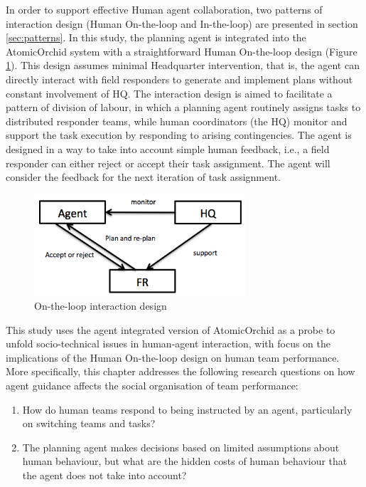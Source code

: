In order to support effective Human agent collaboration, two patterns of interaction design (Human On-the-loop and In-the-loop) are presented in section \ref{sec:patterns}. In this study, the planning agent is integrated into the AtomicOrchid system with a straightforward Human On-the-loop design (Figure \ref{fig:study2OnTheLoop}). This design assumes minimal Headquarter intervention, that is, the agent can directly interact with field responders to generate and implement plans without constant involvement of HQ. The interaction design is aimed to facilitate a pattern of division of labour, in which a planning agent routinely assigns tasks to distributed responder teams, while human coordinators (the HQ) monitor and support the task execution by responding to arising contingencies. The agent is designed in a way to take into account simple human feedback, i.e., a field responder can either reject or accept their task assignment. The agent will consider the feedback for the next iteration of task assignment.\\

\begin{figure}[h]
  \centering
  \includegraphics[width=0.7\textwidth]{img/approach/OnTheLoop}
  \caption{On-the-loop interaction design}
  \label{fig:study2OnTheLoop}
\end{figure}

This study uses the agent integrated version of AtomicOrchid as a probe to unfold socio-technical issues in human-agent interaction, with focus on the implications of the Human On-the-loop design on human team performance. More specifically, this chapter addresses the following research questions on how agent guidance affects the social organisation of team performance:\\

\begin{enumerate}
\item How do human teams respond to being instructed by an agent, particularly on switching teams and tasks?\\
\item The planning agent makes decisions based on limited assumptions about human behaviour, but what are the hidden costs of human behaviour that the agent does not take into account?\\
\end{enumerate}

